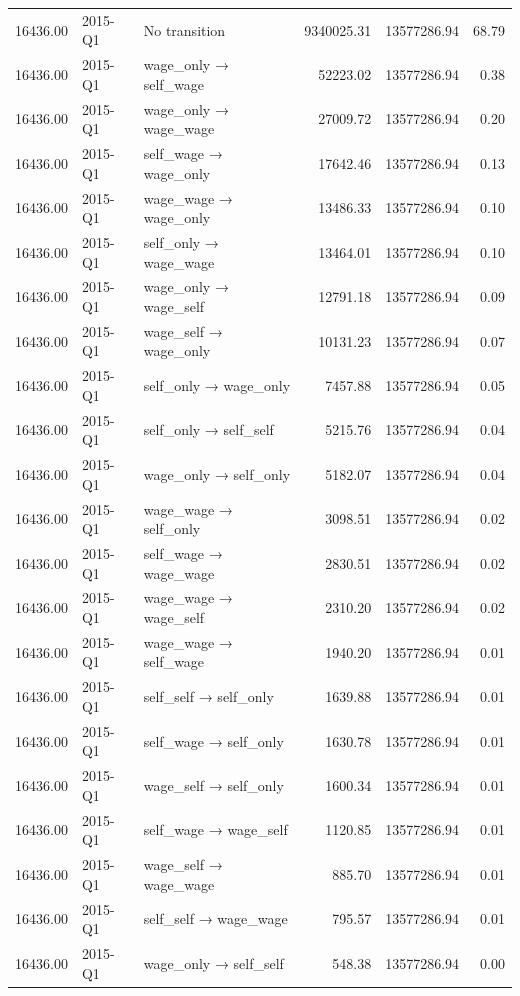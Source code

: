 \begin{table}[ht]
{\begin{tabular}{rllrrr}
  16436.00 & 2015-Q1 & No transition & 9340025.31 & 13577286.94 & 68.79 \\ 
  16436.00 & 2015-Q1 & wage\_only → self\_wage & 52223.02 & 13577286.94 & 0.38 \\ 
  16436.00 & 2015-Q1 & wage\_only → wage\_wage & 27009.72 & 13577286.94 & 0.20 \\ 
  16436.00 & 2015-Q1 & self\_wage → wage\_only & 17642.46 & 13577286.94 & 0.13 \\ 
  16436.00 & 2015-Q1 & wage\_wage → wage\_only & 13486.33 & 13577286.94 & 0.10 \\ 
  16436.00 & 2015-Q1 & self\_only → wage\_wage & 13464.01 & 13577286.94 & 0.10 \\ 
  16436.00 & 2015-Q1 & wage\_only → wage\_self & 12791.18 & 13577286.94 & 0.09 \\ 
  16436.00 & 2015-Q1 & wage\_self → wage\_only & 10131.23 & 13577286.94 & 0.07 \\ 
  16436.00 & 2015-Q1 & self\_only → wage\_only & 7457.88 & 13577286.94 & 0.05 \\ 
  16436.00 & 2015-Q1 & self\_only → self\_self & 5215.76 & 13577286.94 & 0.04 \\ 
  16436.00 & 2015-Q1 & wage\_only → self\_only & 5182.07 & 13577286.94 & 0.04 \\ 
  16436.00 & 2015-Q1 & wage\_wage → self\_only & 3098.51 & 13577286.94 & 0.02 \\ 
  16436.00 & 2015-Q1 & self\_wage → wage\_wage & 2830.51 & 13577286.94 & 0.02 \\ 
  16436.00 & 2015-Q1 & wage\_wage → wage\_self & 2310.20 & 13577286.94 & 0.02 \\ 
  16436.00 & 2015-Q1 & wage\_wage → self\_wage & 1940.20 & 13577286.94 & 0.01 \\ 
  16436.00 & 2015-Q1 & self\_self → self\_only & 1639.88 & 13577286.94 & 0.01 \\ 
  16436.00 & 2015-Q1 & self\_wage → self\_only & 1630.78 & 13577286.94 & 0.01 \\ 
  16436.00 & 2015-Q1 & wage\_self → self\_only & 1600.34 & 13577286.94 & 0.01 \\ 
  16436.00 & 2015-Q1 & self\_wage → wage\_self & 1120.85 & 13577286.94 & 0.01 \\ 
  16436.00 & 2015-Q1 & wage\_self → wage\_wage & 885.70 & 13577286.94 & 0.01 \\ 
  16436.00 & 2015-Q1 & self\_self → wage\_wage & 795.57 & 13577286.94 & 0.01 \\ 
  16436.00 & 2015-Q1 & wage\_only → self\_self & 548.38 & 13577286.94 & 0.00 \\ 

\end{tabular}}
\end{table}
